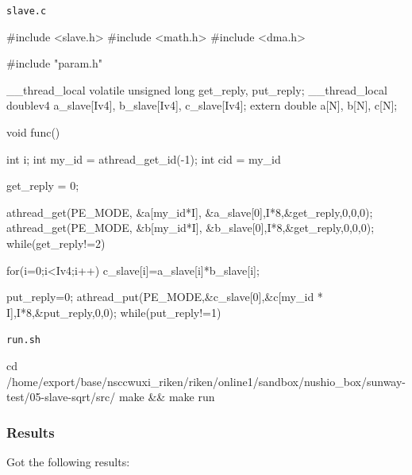 \verb`slave.c`
\begin{code}
#include <slave.h>
#include <math.h>
#include <dma.h>

#include "param.h"

__thread_local volatile unsigned long get_reply, put_reply;
__thread_local doublev4 a_slave[Iv4], b_slave[Iv4], c_slave[Iv4];
extern double a[N], b[N], c[N];

void func() {
  int i;
  int my_id = athread_get_id(-1);
  int cid = my_id%

  get_reply = 0;

  athread_get(PE_MODE, &a[my_id*I], &a_slave[0],I*8,&get_reply,0,0,0);
  athread_get(PE_MODE, &b[my_id*I], &b_slave[0],I*8,&get_reply,0,0,0);
  while(get_reply!=2) {}

  for(i=0;i<Iv4;i++){
    c_slave[i]=a_slave[i]*b_slave[i];
  }

  put_reply=0;
  athread_put(PE_MODE,&c_slave[0],&c[my_id * I],I*8,&put_reply,0,0);
  while(put_reply!=1) {}

}

\end{code}

\verb`run.sh`
\begin{code}

cd /home/export/base/nsccwuxi_riken/riken/online1/sandbox/nushio_box/sunway-test/05-slave-sqrt/src/
make && make run
    
\end{code}

\subsubsection{Results}

Got the following results:

